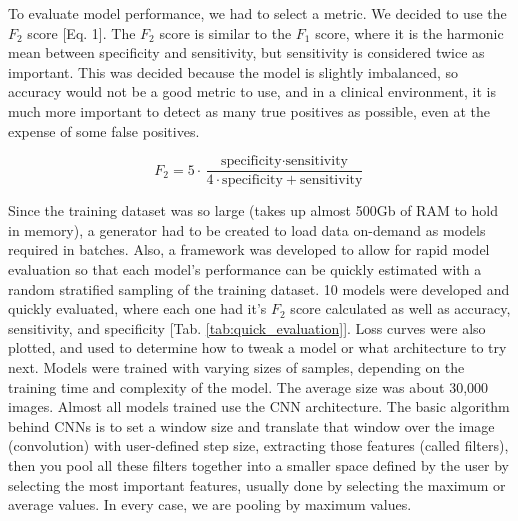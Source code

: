 \documentclass{article}
\begin{document}
    To evaluate model performance, we had to select a metric. We decided to use the $F_2$ score [Eq. 1]. The $F_2$ score is similar to the $F_1$ score, where it is the harmonic mean between specificity and sensitivity, but sensitivity is considered twice as important. This was decided because the model is slightly imbalanced, so accuracy would not be a good metric to use, and in a clinical environment, it is much more important to detect as many true positives as possible, even at the expense of some false positives.
    
\begin{equation}
    F_2 = 5 \cdot \frac{\text{specificity} \cdot \text{sensitivity}}{4 \cdot \text{specificity} + \text{sensitivity}}
    \label{eq:1}
\end{equation}
    
    Since the training dataset was so large (takes up almost 500Gb of RAM to hold in memory), a generator had to be created to load data on-demand as models required in batches. Also, a framework was developed to allow for rapid model evaluation so that each model's performance can be quickly estimated with a random stratified sampling of the training dataset. 10 models were developed and quickly evaluated, where each one had it's $F_2$ score calculated as well as accuracy, sensitivity, and specificity [Tab. \ref{tab:quick_evaluation}]. Loss curves were also plotted, and used to determine how to tweak a model or what architecture to try next. Models were trained with varying sizes of samples, depending on the training time and complexity of the model. The average size was about 30,000 images. Almost all models trained use the CNN architecture. The basic algorithm behind CNNs is to set a window size and translate that window over the image (convolution) with user-defined step size, extracting those features (called filters), then you pool all these filters together into a smaller space defined by the user by selecting the most important features, usually done by selecting the maximum or average values. In every case, we are pooling by maximum values.
\end{document}
